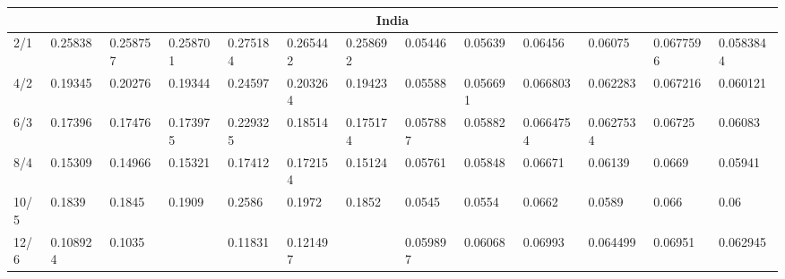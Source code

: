 \begin{landscape}
\begin{table}[tbp]
{\begin{tabular}{@{}lllllllllllll@{}}
\multicolumn{13}{c}{India} \\ \midrule
2/1 & \cellcolor[HTML]{F8A102}0.25838 & \cellcolor[HTML]{F8A102}0.258757 & \cellcolor[HTML]{F8A102}0.258701 & \cellcolor[HTML]{F8A102}0.275184 & \cellcolor[HTML]{F8A102}0.265442 & \cellcolor[HTML]{F8A102}0.258692 & \cellcolor[HTML]{FE0000}0.05446 & \cellcolor[HTML]{FE0000}0.05639 & \cellcolor[HTML]{F8A102}0.06456 & \cellcolor[HTML]{F8A102}0.06075 & \cellcolor[HTML]{F8A102}0.0677596 & \cellcolor[HTML]{F8A102}0.0583844 \\
4/2 & \cellcolor[HTML]{F8A102}0.19345 & \cellcolor[HTML]{F8A102}0.20276 & \cellcolor[HTML]{F8A102}0.19344 & \cellcolor[HTML]{F8A102}0.24597 & \cellcolor[HTML]{F8A102}0.203264 & \cellcolor[HTML]{F8A102}0.19423 & \cellcolor[HTML]{F8A102}0.05588 & \cellcolor[HTML]{F8A102}0.056691 & \cellcolor[HTML]{F8A102}0.066803 & \cellcolor[HTML]{F8A102}0.062283 & \cellcolor[HTML]{F8A102}0.067216 & \cellcolor[HTML]{F8A102}0.060121 \\
6/3 & \cellcolor[HTML]{F8A102}0.17396 & \cellcolor[HTML]{F8A102}0.17476 & \cellcolor[HTML]{F8A102}0.173975 & \cellcolor[HTML]{F8A102}0.229325 & \cellcolor[HTML]{F8A102}0.18514 & \cellcolor[HTML]{F8A102}0.175174 & \cellcolor[HTML]{F8A102}0.057887 & \cellcolor[HTML]{F8A102}0.05882 & \cellcolor[HTML]{F8A102}0.0664754 & \cellcolor[HTML]{F8A102}0.0627534 & \cellcolor[HTML]{F8A102}0.06725 & \cellcolor[HTML]{F8A102}0.06083 \\
8/4 & \cellcolor[HTML]{F8A102}0.15309 & \cellcolor[HTML]{F8A102}0.14966 & \cellcolor[HTML]{F8A102}0.15321 & \cellcolor[HTML]{F8A102}0.17412 & \cellcolor[HTML]{F8A102}0.172154 & \cellcolor[HTML]{F8A102}0.15124 & \cellcolor[HTML]{F8A102}0.05761 & \cellcolor[HTML]{F8A102}0.05848 & \cellcolor[HTML]{F8A102}0.06671 & \cellcolor[HTML]{F8A102}0.06139 & \cellcolor[HTML]{F8A102}0.0669 & \cellcolor[HTML]{F8A102}0.05941 \\
10/5 & \cellcolor[HTML]{F8A102}0.1839 & \cellcolor[HTML]{F8A102}0.1845 & \cellcolor[HTML]{F8A102}0.1909 & \cellcolor[HTML]{F8A102}0.2586 & \cellcolor[HTML]{F8A102}0.1972 & \cellcolor[HTML]{F8A102}0.1852 & \cellcolor[HTML]{F8A102}0.0545 & \cellcolor[HTML]{F8A102}0.0554 & \cellcolor[HTML]{F8A102}0.0662 & \cellcolor[HTML]{F8A102}0.0589 & \cellcolor[HTML]{F8A102}0.066 & \cellcolor[HTML]{F8A102}0.06 \\
12/6 & \cellcolor[HTML]{F8A102}0.108924 & \cellcolor[HTML]{F8A102}0.1035 & \cellcolor[HTML]{F8A102}{\color[HTML]{34FF34} \textbf{0.11205}} & \cellcolor[HTML]{F8A102}0.11831 & \cellcolor[HTML]{F8A102}0.121497 & \cellcolor[HTML]{F8A102}{\color[HTML]{34FF34} \textbf{0.10587}} & \cellcolor[HTML]{F8A102}0.059897 & \cellcolor[HTML]{F8A102}0.06068 & \cellcolor[HTML]{F8A102}0.06993 & \cellcolor[HTML]{F8A102}0.064499 & \cellcolor[HTML]{F8A102}0.06951 & \cellcolor[HTML]{F8A102}0.062945 \\

\end{tabular}}
\end{table}
\end{landscape}
